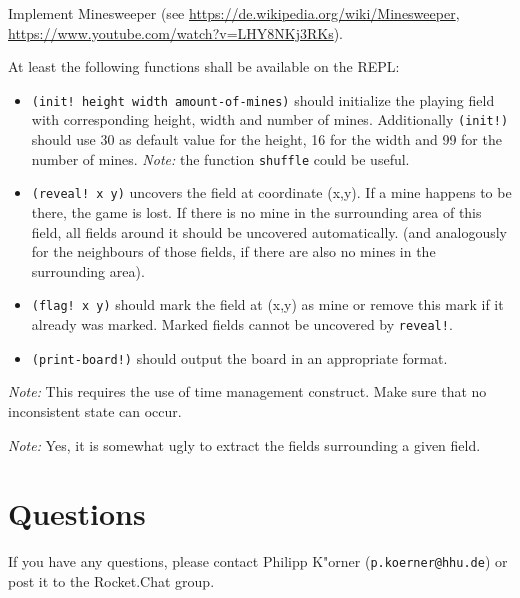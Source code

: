 \documentclass[11pt,a4paper]{article}
\begin{document}
\begin{exercise}[Minesweeper]
Implement Minesweeper (see \url{https://de.wikipedia.org/wiki/Minesweeper}, \url{https://www.youtube.com/watch?v=LHY8NKj3RKs}). 

At least the following functions shall be available on the REPL:

\begin{itemize}
\item \texttt{(init! height width amount-of-mines)} should initialize the playing field with corresponding height, width and number of mines.
Additionally \texttt{(init!)} should use 30 as default value for the height, 16 for the width and 99 for the number of mines.
\emph{Note:} the function \verb|shuffle| could be useful.
\item \texttt{(reveal! x y)} uncovers the field at coordinate (x,y). If a mine happens to be there, the game is lost.
If there is no mine in the surrounding area of this field, all fields around it should be uncovered automatically.
(and analogously for the neighbours of those fields, if there are also no mines in the surrounding area).
\item \texttt{(flag! x y)} should mark the field at (x,y) as mine or remove this mark if it already was marked.
Marked fields cannot be uncovered by \texttt{reveal!}.
\item \texttt{(print-board!)} should output the board in an appropriate format.
\end{itemize}

\emph{Note:} This requires the use of time management construct. Make sure that no inconsistent state can occur.

\emph{Note:} Yes, it is somewhat ugly to extract the fields surrounding a given field.

\end{exercise}


	\section*{Questions}
	If you have any questions, please contact Philipp K"orner (\texttt{p.koerner@hhu.de}) or post it to the Rocket.Chat group.
\end{document}
